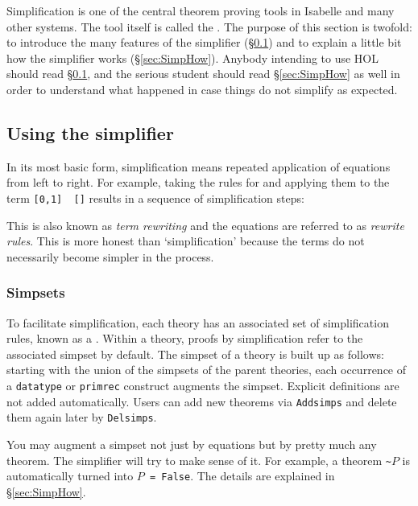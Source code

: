 Simplification is one of the central theorem proving tools in Isabelle and
many other systems. The tool itself is called the . The
purpose of this section is twofold: to introduce the many features of the
simplifier (\S\ref{sec:SimpFeatures}) and to explain a little bit how the
simplifier works (\S\ref{sec:SimpHow}).  Anybody intending to use HOL should
read \S\ref{sec:SimpFeatures}, and the serious student should read
\S\ref{sec:SimpHow} as well in order to understand what happened in case
things do not simplify as expected.


\subsection{Using the simplifier}
\label{sec:SimpFeatures}

In its most basic form, simplification means repeated application of
equations from left to right. For example, taking the rules for \texttt{\at}
and applying them to the term \texttt{[0,1] \at\ []} results in a sequence of
simplification steps:
This is also known as {\em term rewriting} and the equations are referred
to as {\em rewrite rules}. This is more honest than `simplification' because
the terms do not necessarily become simpler in the process.

\subsubsection{Simpsets}

To facilitate simplification, each theory has an associated set of
simplification rules, known as a . Within a theory,
proofs by simplification refer to the associated simpset by default.
The simpset of a theory is built up as follows: starting with the union of
the simpsets of the parent theories, each occurrence of a \texttt{datatype}
or \texttt{primrec} construct augments the simpset. Explicit definitions are
not added automatically. Users can add new theorems via \texttt{Addsimps} and
delete them again later by \texttt{Delsimps}.

You may augment a simpset not just by equations but by pretty much any
theorem. The simplifier will try to make sense of it.  For example, a theorem
\verb$~$$P$ is automatically turned into \texttt{$P$ = False}. The details are
explained in \S\ref{sec:SimpHow}.

